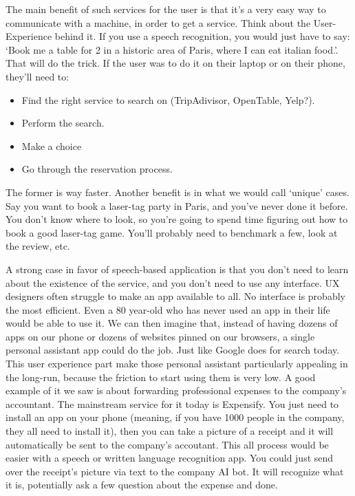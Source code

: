\documentclass[12pt]{article}
\begin{document}
The main benefit of such services for the user is that it's a very easy way to
communicate with a machine, in order to get a service. Think about the
User-Experience behind it. If you use a speech recognition, you would just
have to say: \lq Book me a table for 2 in a historic area of Paris, where I
can eat italian
food.\rq. That will do the trick.
If the user was to do it on their laptop or on their phone, they'll need to:
\begin{itemize}
  \item Find the right service to search on (TripAdivisor, OpenTable, Yelp?).
  \item Perform the search.
  \item Make a choice
  \item Go through the reservation process.
\end{itemize}

The former is way faster. Another benefit is in what we would call \lq unique\rq
cases. Say you want to book a laser-tag party in Paris, and you've never done it
before. You don't know where to look, so you're going to spend time figuring out
how to book a good laser-tag game. You'll probably need to benchmark a few,
look at the review, etc.

A strong case in favor of speech-based application is that you don't need to
learn about the existence of the service, and you don't need to use any
interface. UX designers often struggle to make an app available to all. No
interface is probably the most efficient. Even a 80 year-old who has never used
an app in their life would be able to use it. We can then imagine that, instead
of having dozens of apps on our phone or dozens of websites pinned on our
browsers, a single personal assistant app could do the job. Just like Google
does for search today. This user experience part make those personal assistant
particularly appealing in the long-run, because the friction to start using them
is very low. A good example of it we saw is about forwarding professional
expenses to the company's accountant. The mainstream service for it today is
Expensify. You just need to install an app on your phone (meaning, if you have
1000 people in the company, they all need to install it), then you can take a
picture of a receipt and it will automatically be sent to the company's
accoutant. This all process would be easier with a speech or written language
recognition app. You could just send over the receipt's picture via text to the
company AI bot. It will recognize what it is, potentially ask a few question
about the expense and done.
\end{document}
